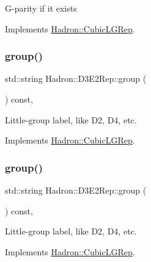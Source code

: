 G-\/parity if it exists 

Implements \mbox{\hyperlink{structHadron_1_1CubicLGRep_ace26f7b2d55e3a668a14cb9026da5231}{Hadron\+::\+Cubic\+L\+G\+Rep}}.

\mbox{\label{structHadron_1_1D3E2Rep_a81f6acc24c457b0fcdbbc468848dbfa1}} 
\subsubsection{\texorpdfstring{group()}{group()}\hspace{0.1cm}{\footnotesize\ttfamily [1/5]}}
{\footnotesize\ttfamily std\+::string Hadron\+::\+D3\+E2\+Rep\+::group (\begin{DoxyParamCaption}{ }\end{DoxyParamCaption}) const\hspace{0.3cm}{\ttfamily [inline]}, {\ttfamily [virtual]}}

Little-\/group label, like D2, D4, etc. 

Implements \mbox{\hyperlink{structHadron_1_1CubicLGRep_a9bdb14b519a611d21379ed96a3a9eb41}{Hadron\+::\+Cubic\+L\+G\+Rep}}.

\mbox{\label{structHadron_1_1D3E2Rep_a81f6acc24c457b0fcdbbc468848dbfa1}} 
\subsubsection{\texorpdfstring{group()}{group()}\hspace{0.1cm}{\footnotesize\ttfamily [2/5]}}
{\footnotesize\ttfamily std\+::string Hadron\+::\+D3\+E2\+Rep\+::group (\begin{DoxyParamCaption}{ }\end{DoxyParamCaption}) const\hspace{0.3cm}{\ttfamily [inline]}, {\ttfamily [virtual]}}

Little-\/group label, like D2, D4, etc. 

Implements \mbox{\hyperlink{structHadron_1_1CubicLGRep_a9bdb14b519a611d21379ed96a3a9eb41}{Hadron\+::\+Cubic\+L\+G\+Rep}}.

\mbox{\label{structHadron_1_1D3E2Rep_a81f6acc24c457b0fcdbbc468848dbfa1}} 
